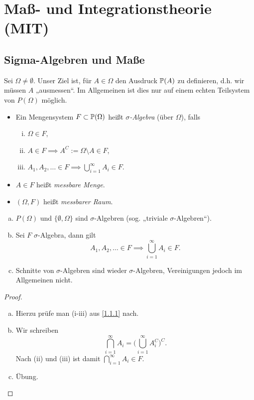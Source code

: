 \chapter{Maß- und Integrationstheorie (MIT)}


\section{Sigma-Algebren und Maße}

Sei $\Omega \neq \emptyset$.
Unser Ziel ist, für $A \in \Omega$ den Ausdruck $\P(A)$ zu definieren, d.h. wir müssen $A$ „ausmessen“.
Im Allgemeinen ist dies nur auf einem echten Teilsystem von $P(\Omega)$ möglich.

\begin{df} \label{1.1.1}
	\begin{itemize}
		\item
			Ein Mengensystem $F \subset \P(\Omega)$ heißt \emph{$\sigma$-Algebra} (über $\Omega$), falls
			\begin{enumerate}[(i)]
				\item
					$\Omega \in F$,
				\item
					$A \in F \implies A^C := \Omega \setminus A \in F$,
				\item
					$A_1, A_2, \dotsc \in F \implies \bigcup_{i=1}^\infty A_i \in F$.
			\end{enumerate}
		\item
			$A \in F$ heißt \emph{messbare Menge}.
		\item
			$(\Omega, F)$ heißt \emph{messbarer Raum}.
	\end{itemize}
\end{df}

\begin{nt} \label{1.1.2}
	\begin{enumerate}[(a)]
		\item
			$P(\Omega)$ und $\{\emptyset, \Omega\}$ sind $\sigma$-Algebren (sog. „triviale $\sigma$-Algebren“).
		\item
			Sei $F$ $\sigma$-Algebra, dann gilt
			\[
				A_1, A_2, \dotsc \in F \implies \bigcup_{i=1}^\infty A_i \in F.
			\]
		\item
			Schnitte von $\sigma$-Algebren sind wieder $\sigma$-Algebren, Vereinigungen jedoch im Allgemeinen nicht.
	\end{enumerate}
	\begin{proof}
		\begin{enumerate}[(a)]
			\item
				Hierzu prüfe man (i-iii) aus \ref{1.1.1} nach.
			\item
				Wir schreiben
				\[
					\bigcap_{i=1}^\infty A_i
					= \bigg( \bigcup_{i=1}^\infty A_i^C \bigg)^C.
				\]
				Nach (ii) und (iii) ist damit $\bigcap_{i=1}^\infty A_i \in F$.
			\item
				Übung.
		\end{enumerate}
	\end{proof}
\end{nt}

